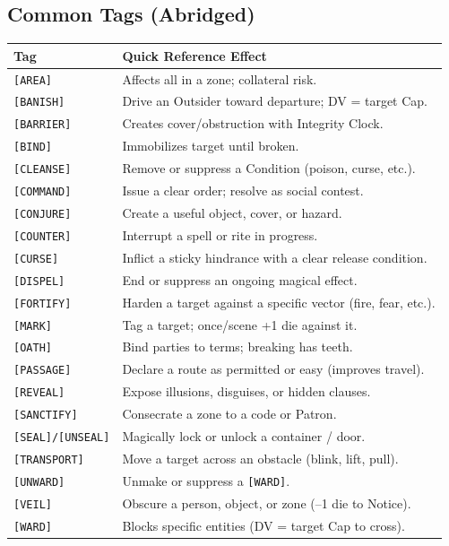 \subsection{Common Tags (Abridged)}
\begin{center}
\begin{longtable}{|p{3.5cm}|p{10.0cm}|}
\hline
\textbf{Tag} & \textbf{Quick Reference Effect} \\ \hline
\texttt{[AREA]} & Affects all in a zone; collateral risk. \\ \hline
\texttt{[BANISH]} & Drive an Outsider toward departure; DV = target Cap. \\ \hline
\texttt{[BARRIER]} & Creates cover/obstruction with Integrity Clock. \\ \hline
\texttt{[BIND]} & Immobilizes target until broken. \\ \hline
\texttt{[CLEANSE]} & Remove or suppress a Condition (poison, curse, etc.). \\ \hline
\texttt{[COMMAND]} & Issue a clear order; resolve as social contest. \\ \hline
\texttt{[CONJURE]} & Create a useful object, cover, or hazard. \\ \hline
\texttt{[COUNTER]} & Interrupt a spell or rite in progress. \\ \hline
\texttt{[CURSE]} & Inflict a sticky hindrance with a clear release condition. \\ \hline
\texttt{[DISPEL]} & End or suppress an ongoing magical effect. \\ \hline
\texttt{[FORTIFY]} & Harden a target against a specific vector (fire, fear, etc.). \\ \hline
\texttt{[MARK]} & Tag a target; once/scene +1 die against it. \\ \hline
\texttt{[OATH]} & Bind parties to terms; breaking has teeth. \\ \hline
\texttt{[PASSAGE]} & Declare a route as permitted or easy (improves travel). \\ \hline
\texttt{[REVEAL]} & Expose illusions, disguises, or hidden clauses. \\ \hline
\texttt{[SANCTIFY]} & Consecrate a zone to a code or Patron. \\ \hline
\texttt{[SEAL]/[UNSEAL]} & Magically lock or unlock a container / door. \\ \hline
\texttt{[TRANSPORT]} & Move a target across an obstacle (blink, lift, pull). \\ \hline
\texttt{[UNWARD]} & Unmake or suppress a \texttt{[WARD]}. \\ \hline
\texttt{[VEIL]} & Obscure a person, object, or zone (–1 die to Notice). \\ \hline
\texttt{[WARD]} & Blocks specific entities (DV = target Cap to cross). \\ \hline
\end{longtable}
\end{center}


